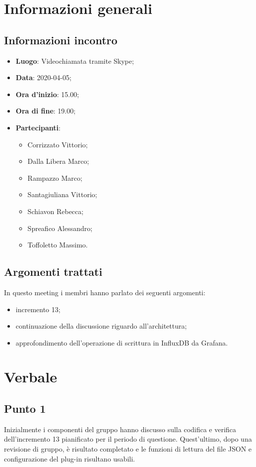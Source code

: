\section{Informazioni generali}
    \subsection{Informazioni incontro}
        \begin{itemize}
            \item \textbf{Luogo}: Videochiamata tramite Skype;
            \item \textbf{Data}: 2020-04-05;
            \item \textbf{Ora d'inizio}: 15.00;
            \item \textbf{Ora di fine}: 19.00;
            \item \textbf{Partecipanti}: \begin{itemize}
                \item Corrizzato Vittorio;
                \item Dalla Libera Marco;
                \item Rampazzo Marco;
                \item Santagiuliana Vittorio;
                \item Schiavon Rebecca;
                \item Spreafico Alessandro;
                \item Toffoletto Massimo.
            \end{itemize}
        \end{itemize}
    \subsection{Argomenti trattati}
        In questo meeting i membri hanno parlato dei seguenti argomenti:
        \begin{itemize}
            \item incremento 13;
            \item continuazione della discussione riguardo all'architettura;
            \item approfondimento dell'operazione di scrittura in InfluxDB da Grafana\glo.
        \end{itemize}
\section{Verbale}
    \subsection{Punto 1}
        Inizialmente i componenti del gruppo hanno discusso sulla codifica e verifica dell'incremento 13 pianificato per il periodo di questione. Quest'ultimo, dopo una revisione di gruppo, è risultato completato e le funzioni di lettura del file JSON e configurazione del plug-in risultano usabili.

